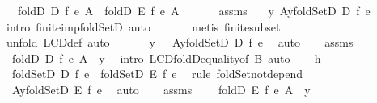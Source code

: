 \begin{isabellebody}
\ \ \ {\isachardoublequoteopen}foldD\ D\ f\ e\ A\ {\isacharequal}\ foldD\ E\ f\ e\ A{\isachardoublequoteclose}\isanewline
%
\isadelimproof
%
\endisadelimproof
%
\isatagproof
{}\isamarkupfalse%
\ {\isacharminus}\ \isanewline
\ \ \isamarkupfalse%
\ assms\ \isamarkupfalse%
\ {}{\isacharcolon}\ {\isachardoublequoteopen}{\isasymexists}y{\isachardot}\ {\isacharparenleft}A{\isacharcomma}y{\isacharparenright}{\isasymin}foldSetD\ D\ f\ e{\isachardoublequoteclose}\isanewline
\ \ \ \ \isamarkupfalse%
\ {\isacharparenleft}intro\ finite{\isacharunderscore}imp{\isacharunderscore}foldSetD{\isacharcomma}\ auto{\isacharparenright}\isanewline
\ \ \ \ \ \isamarkupfalse%
\ {\isacharparenleft}metis\ finite{\isacharunderscore}subset{\isacharparenright}\isanewline
\ \ \ \ \isamarkupfalse%
\ {\isacharparenleft}unfold\ LCD{\isacharunderscore}def{\isacharcomma}\ auto{\isacharparenright}\isanewline
\ \ \isamarkupfalse%
\ {}\ \isamarkupfalse%
\ y\ \ {}{\isacharcolon}\ {\isachardoublequoteopen}{\isacharparenleft}A{\isacharcomma}y{\isacharparenright}{\isasymin}foldSetD\ D\ f\ e{\isachardoublequoteclose}\ \isamarkupfalse%
\ auto\isanewline
\ \ \isamarkupfalse%
\ assms\ {}\ \isamarkupfalse%
\ {}{\isacharcolon}\ {\isachardoublequoteopen}foldD\ D\ f\ e\ A\ {\isacharequal}\ y{\isachardoublequoteclose}\ \isamarkupfalse%
\ {\isacharparenleft}intro\ LCD{\isachardot}foldD{\isacharunderscore}equality{\isacharbrackleft}of\ B{\isacharbrackright}{\isacharcomma}\ auto{\isacharparenright}\isanewline
\ \ \isamarkupfalse%
\ h{}\ \isamarkupfalse%
\ {}{\isacharcolon}\ {\isachardoublequoteopen}foldSetD\ D\ f\ e\ {\isasymsubseteq}\ foldSetD\ E\ f\ e{\isachardoublequoteclose}\ \isamarkupfalse%
\ {\isacharparenleft}rule\ foldSet{\isacharunderscore}not{\isacharunderscore}depend{\isacharparenright}\isanewline
\ \ \isamarkupfalse%
\ {}\ {}\ \isamarkupfalse%
\ {}{\isacharcolon}\ {\isachardoublequoteopen}{\isacharparenleft}A{\isacharcomma}y{\isacharparenright}{\isasymin}foldSetD\ E\ f\ e{\isachardoublequoteclose}\ \isamarkupfalse%
\ auto\isanewline
\ \ \isamarkupfalse%
\ assms\ {}\ \isamarkupfalse%
\ {}{\isacharcolon}\ {\isachardoublequoteopen}foldD\ E\ f\ e\ A\ {\isacharequal}\ y{\isachardoublequoteclose}\ \isamarkupfalse%

\end{isabellebody}
